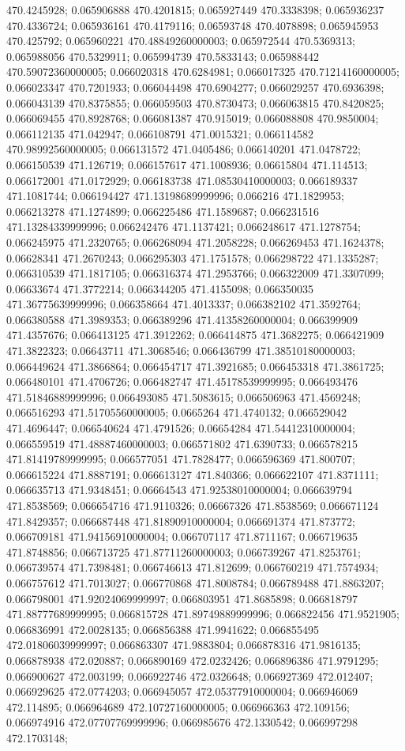 470.4245928; 0.065906888 470.4201815; 0.065927449 470.3338398; 0.065936237 470.4336724; 0.065936161 470.4179116; 0.06593748 470.4078898; 0.065945953 470.425792; 0.065960221 470.48849260000003; 0.065972544 470.5369313; 0.065988056 470.5329911; 0.065994739 470.5833143; 0.065988442 470.59072360000005; 0.066020318 470.6284981; 0.066017325 470.71214160000005; 0.066023347 470.7201933; 0.066044498 470.6904277; 0.066029257 470.6936398; 0.066043139 470.8375855; 0.066059503 470.8730473; 0.066063815 470.8420825; 0.066069455 470.8928768; 0.066081387 470.915019; 0.066088808 470.9850004; 0.066112135 471.042947; 0.066108791 471.0015321; 0.066114582 470.98992560000005; 0.066131572 471.0405486; 0.066140201 471.0478722; 0.066150539 471.126719; 0.066157617 471.1008936; 0.06615804 471.114513; 0.066172001 471.0172929; 0.066183738 471.08530410000003; 0.066189337 471.1081744; 0.066194427 471.13198689999996; 0.066216 471.1829953; 0.066213278 471.1274899; 0.066225486 471.1589687; 0.066231516 471.13284339999996; 0.066242476 471.1137421; 0.066248617 471.1278754; 0.066245975 471.2320765; 0.066268094 471.2058228; 0.066269453 471.1624378; 0.06628341 471.2670243; 0.066295303 471.1751578; 0.066298722 471.1335287; 0.066310539 471.1817105; 0.066316374 471.2953766; 0.066322009 471.3307099; 0.06633674 471.3772214; 0.066344205 471.4155098; 0.066350035 471.36775639999996; 0.066358664 471.4013337; 0.066382102 471.3592764; 0.066380588 471.3989353; 0.066389296 471.41358260000004; 0.066399909 471.4357676; 0.066413125 471.3912262; 0.066414875 471.3682275; 0.066421909 471.3822323; 0.06643711 471.3068546; 0.066436799 471.38510180000003; 0.066449624 471.3866864; 0.066454717 471.3921685; 0.066453318 471.3861725; 0.066480101 471.4706726; 0.066482747 471.45178539999995; 0.066493476 471.51846889999996; 0.066493085 471.5083615; 0.066506963 471.4569248; 0.066516293 471.51705560000005; 0.0665264 471.4740132; 0.066529042 471.4696447; 0.066540624 471.4791526; 0.06654284 471.54412310000004; 0.066559519 471.48887460000003; 0.066571802 471.6390733; 0.066578215 471.81419789999995; 0.066577051 471.7828477; 0.066596369 471.800707; 0.066615224 471.8887191; 0.066613127 471.840366; 0.066622107 471.8371111; 0.066635713 471.9348451; 0.06664543 471.92538010000004; 0.066639794 471.8538569; 0.066654716 471.9110326; 0.06667326 471.8538569; 0.066671124 471.8429357; 0.066687448 471.81890910000004; 0.066691374 471.873772; 0.066709181 471.94156910000004; 0.066707117 471.8711167; 0.066719635 471.8748856; 0.066713725 471.87711260000003; 0.066739267 471.8253761; 0.066739574 471.7398481; 0.066746613 471.812699; 0.066760219 471.7574934; 0.066757612 471.7013027; 0.066770868 471.8008784; 0.066789488 471.8863207; 0.066798001 471.92024069999997; 0.066803951 471.8685898; 0.066818797 471.88777689999995; 0.066815728 471.89749889999996; 0.066822456 471.9521905; 0.066836991 472.0028135; 0.066856388 471.9941622; 0.066855495 472.01806039999997; 0.066863307 471.9883804; 0.066878316 471.9816135; 0.066878938 472.020887; 0.066890169 472.0232426; 0.066896386 471.9791295; 0.066900627 472.003199; 0.066922746 472.0326648; 0.066927369 472.012407; 0.066929625 472.0774203; 0.066945057 472.05377910000004; 0.066946069 472.114895; 0.066964689 472.10727160000005; 0.066966363 472.109156; 0.066974916 472.07707769999996; 0.066985676 472.1330542; 0.066997298 472.1703148; 